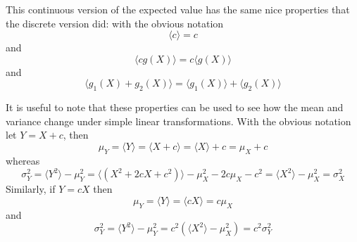 \documentclass[11pt,a4paper]{scrartcl}
\begin{document}
This continuous version of the expected value has the same nice
properties that the discrete version did: with the obvious notation
\begin{equation}
\langle c\rangle=c
\end{equation}
and
\begin{equation}
\langle cg(X)\rangle =c\langle g(X)\rangle
\end{equation}
and 
\begin{equation}
\langle g_1(X)+g_2(X)\rangle =\langle g_1(X)\rangle +\langle g_2(X)\rangle
\end{equation}

It is useful to note that these properties can be used to see how the
mean and variance change under simple linear transformations. With the
obvious notation let $Y=X+c$, then
\begin{equation}
\mu_Y=\langle Y\rangle =\langle X+c\rangle=\langle X \rangle +c=\mu_X+c
\end{equation}
whereas
\begin{equation}
\sigma^2_Y=\langle Y^2\rangle-\mu_Y^2=\langle(X^2+2cX+c^2)\rangle-\mu_X^2-2c\mu_X-c^2=\langle X^2\rangle -\mu_X^2=\sigma_X^2
\end{equation}
Similarly, if $Y=cX$ then
\begin{equation}
\mu_Y=\langle Y\rangle=\langle cX\rangle=c\mu_X
\end{equation}
and
\begin{equation}
\sigma_Y^2=\langle Y^2\rangle -\mu_Y^2=c^2(\langle X^2\rangle-\mu_X^2)=c^2\sigma_Y^2\end{equation}

\newpage


\end{document}
